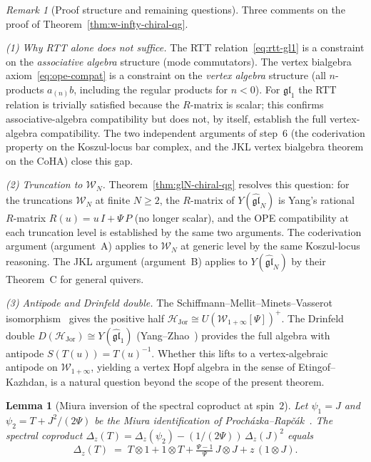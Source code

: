 \documentclass[11pt,reqno]{amsart}
\newtheorem{lemma}[theorem]{Lemma}
\theoremstyle{definition}
\theoremstyle{remark}
\newtheorem{remark}[theorem]{Remark}
\newcommand{\cH}{\mathcal{H}}
\newcommand{\cW}{\mathcal{W}}
\numberwithin{equation}{section}
\begin{document}
\begin{remark}[Proof structure and remaining questions]
\label{rem:w-infty-vertex-gap}
Three comments on the proof of
Theorem~\textup{\ref{thm:w-infty-chiral-qg}}.

\smallskip
\noindent\emph{(1) Why RTT alone does not suffice.}
The RTT relation~\eqref{eq:rtt-gl1} is a constraint on the
\emph{associative algebra} structure (mode commutators).
The vertex bialgebra axiom~\eqref{eq:ope-compat} is a
constraint on the \emph{vertex algebra} structure (all
$n$-products $a_{(n)}b$, including the regular products for
$n < 0$). For $\mathfrak{gl}_1$ the RTT relation is
trivially satisfied because the $R$-matrix is scalar; this
confirms associative-algebra compatibility but does not, by
itself, establish the full vertex-algebra compatibility.
The two independent arguments of step~6 (the
coderivation property on the Koszul-locus bar complex, and
the JKL vertex bialgebra theorem on the CoHA) close this
gap.

\smallskip
\noindent\emph{(2) Truncation to $\cW_N$.}
Theorem~\ref{thm:glN-chiral-qg} resolves this question:
for the truncations $\cW_N$ at finite $N \geq 2$, the
$R$-matrix of $Y(\widehat{\mathfrak{gl}}_N)$ is Yang's
rational $R$-matrix $R(u) = u\, I + \Psi\, P$ (no longer
scalar), and the OPE compatibility at each truncation level
is established by the same two arguments.
The coderivation argument (argument~A) applies to
$\cW_N$ at generic level by the same Koszul-locus reasoning.
The JKL argument (argument~B) applies to
$Y(\widehat{\mathfrak{gl}}_N)$ by their Theorem~C for
general quivers.

\smallskip
\noindent\emph{(3) Antipode and Drinfeld double.}
The Schiffmann--Mellit--Minets--Vasserot
isomorphism~\cite{SMMV23} gives the positive half
$\cH_{\mathrm{Jor}} \cong U(\cW_{1+\infty}[\Psi])^+$.
The Drinfeld double
$D(\cH_{\mathrm{Jor}}) \cong
Y(\widehat{\mathfrak{gl}}_1)$ (Yang--Zhao~\cite{YZ18a})
provides the full algebra with antipode
$S(T(u)) = T(u)^{-1}$. Whether this lifts to a
vertex-algebraic antipode on $\cW_{1+\infty}$, yielding a
vertex Hopf algebra in the sense of Etingof--Kazhdan, is a
natural question beyond the scope of the present theorem.
\end{remark}

\begin{lemma}[Miura inversion of the spectral coproduct at
spin~$2$]
\label{lem:coprod-T-miura}
Let $\psi_1 = J$ and $\psi_2 = T + J^2/(2\Psi)$ be the
Miura identification of
Proch\'azka--Rap\v{c}\'ak~\textup{\cite{PR19}}.
The spectral coproduct
$\Delta_z(T)
= \Delta_z(\psi_2) - (1/(2\Psi))\,\Delta_z(J)^2$
equals
\begin{equation}\label{eq:coprod-T-derived}
  \Delta_z(T)
  \;=\;
  T \otimes 1
  + 1 \otimes T
  + \tfrac{\Psi - 1}{\Psi}\,
  J \otimes J
  + z\,(1 \otimes J).
\end{equation}
\end{lemma}
\end{document}

